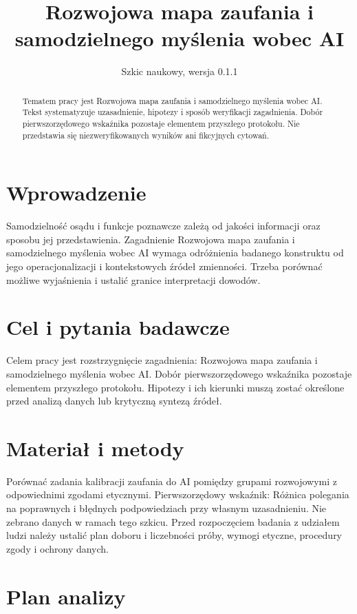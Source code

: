 \documentclass[11pt,a4paper]{article}
\title{Rozwojowa mapa zaufania i samodzielnego myślenia wobec AI}
\author{}
\date{Szkic naukowy, wersja 0.1.1}
\begin{document}
\maketitle

\begin{abstract}

Tematem pracy jest Rozwojowa mapa zaufania i samodzielnego myślenia wobec AI. Tekst systematyzuje uzasadnienie, hipotezy i sposób weryfikacji zagadnienia. Dobór pierwszorzędowego wskaźnika pozostaje elementem przyszłego protokołu. Nie przedstawia się niezweryfikowanych wyników ani fikcyjnych cytowań.

\end{abstract}

\section{Wprowadzenie}

Samodzielność osądu i funkcje poznawcze zależą od jakości informacji oraz sposobu jej przedstawienia. Zagadnienie Rozwojowa mapa zaufania i samodzielnego myślenia wobec AI wymaga odróżnienia badanego konstruktu od jego operacjonalizacji i kontekstowych źródeł zmienności. Trzeba porównać możliwe wyjaśnienia i ustalić granice interpretacji dowodów.

\section{Cel i pytania badawcze}

Celem pracy jest rozstrzygnięcie zagadnienia: Rozwojowa mapa zaufania i samodzielnego myślenia wobec AI. Dobór pierwszorzędowego wskaźnika pozostaje elementem przyszłego protokołu. Hipotezy i ich kierunki muszą zostać określone przed analizą danych lub krytyczną syntezą źródeł.

\section{Materiał i metody}

Porównać zadania kalibracji zaufania do AI pomiędzy grupami rozwojowymi z odpowiednimi zgodami etycznymi. Pierwszorzędowy wskaźnik: Różnica polegania na poprawnych i błędnych podpowiedziach przy własnym uzasadnieniu. Nie zebrano danych w ramach tego szkicu. Przed rozpoczęciem badania z udziałem ludzi należy ustalić plan doboru i liczebności próby, wymogi etyczne, procedury zgody i ochrony danych.

\section{Plan analizy}
\end{document}
